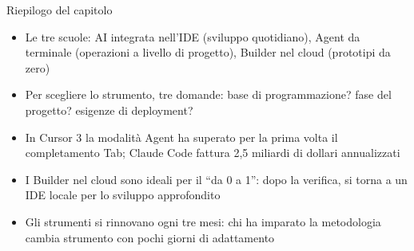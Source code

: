 \begin{tcbsummary}{Riepilogo del capitolo}
\begin{itemize}
  \item Le tre scuole: AI integrata nell'IDE (sviluppo quotidiano), Agent da terminale (operazioni a livello di progetto), Builder nel cloud (prototipi da zero)
  \item Per scegliere lo strumento, tre domande: base di programmazione? fase del progetto? esigenze di deployment?
  \item In Cursor 3 la modalità Agent ha superato per la prima volta il completamento Tab; Claude Code fattura 2,5 miliardi di dollari annualizzati
  \item I Builder nel cloud sono ideali per il “da 0 a 1”: dopo la verifica, si torna a un IDE locale per lo sviluppo approfondito
  \item Gli strumenti si rinnovano ogni tre mesi: chi ha imparato la metodologia cambia strumento con pochi giorni di adattamento
\end{itemize}

\end{tcbsummary}
